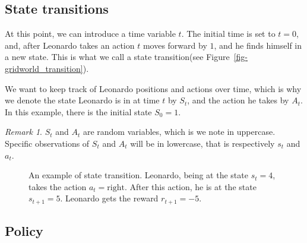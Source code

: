 \documentclass[
  letterpaper,
]{report}
\theoremstyle{definition}
\theoremstyle{plain}
\theoremstyle{definition}
\theoremstyle{remark}
\newtheorem*{remark}{Remark}
\begin{document}
\subsection{State transitions}\label{state-transitions}

At this point, we can introduce a time variable \(t\). The initial time
is set to \(t=0\), and, after Leonardo takes an action \(t\) moves
forward by \(1\), and he finds himself in a new state. This is what we
call a state transition(see Figure~\ref{fig-gridworld_transition}).

We want to keep track of Leonardo positions and actions over time, which
is why we denote the state Leonardo is in at time \(t\) by \(S_t\), and
the action he takes by \(A_t\). In this example, there is the initial
state \(S_0 = 1\).

\begin{remark}
\(S_t\) and \(A_t\) are random variables, which is we note in uppercase.
Specific observations of \(S_t\) and \(A_t\) will be in lowercase, that
is respectively \(s_t\) and \(a_t\).
\end{remark}

\begin{figure}


\caption{\label{fig-gridworld\_transition}An example of state
transition. Leonardo, being at the state \(s_t = 4\), takes the action
\(a_t = \text{right}\). After this action, he is at the state
\(s_{t+1} = 5\). Leonardo gets the reward \(r_{t+1} = -5\).}

\end{figure}%

\subsection{Policy}\label{policy}
\end{document}
